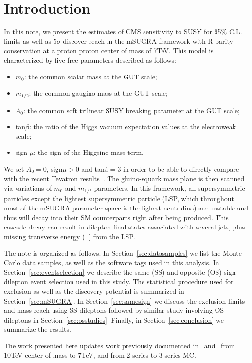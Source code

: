 \section{Introduction}
\label{sec:intro}

In this note, we present the estimates of CMS sensitivity to SUSY for
95\% C.L. limits as well as $5\sigma$ discover reach 
in the mSUGRA framework with R-parity conservation at a proton proton
center of mass of 7TeV. This model is characterized by five 
free parameters described as follows: 

\begin{itemize}
\item $m_{0}$: the common scalar mass at the GUT scale; 
\item $m_{1/2}$: the common gaugino mass at the GUT scale; 
\item $A_{0}$: the common soft trilinear SUSY breaking parameter at
  the GUT scale; 
\item tan$\beta$: the ratio of the Higgs vacuum expectation values at
  the electroweak scale; 
\item sign $\mu$: the sign of the Higgsino mass term. 
\end{itemize}

We set $A_{0} = 0$, sign$\mu > 0$ and tan$\beta = 3$ in order to be
able to directly compare with the recent Tevatron
results~\cite{cdf:recentSusy,d0:recentSusy}. The gluino-squark
mass plane is then scanned  via variations of $m_{0}$ and $m_{1/2}$
parameters. In this framework, all supersymmetric particles except the
lightest supersymmetric particle (LSP, which throughout most of the
mSUGRA parameter space is the lighest neutralino) are unstable and
thus will decay into their SM counterparts right after being
produced. This cascade decay can result in dilepton final states
associated  with several jets, plus missing transverse energy (\met~)
from the LSP.  

The note is organized as follows. In Section~\ref{sec:datasamples} we
list the Monte Carlo data samples, as well as the  software tags used
in this analysis. In Section~\ref{sec:eventselection} we describe the
same (SS) and opposite (OS) sign  dilepton event selection used in
this study. The statistical procedure used for exclusion as well as
the discovery potential is summarized in Section~\ref{sec:mSUGRA}. In
Section~\ref{sec:samesign} we discuss the exclusion limits and mass
reach using SS dileptons followed by similar study involving OS
dileptons in Section~\ref{sec:osstudies}. Finally, in
Section~\ref{sec:conclusion} we summarize the results.  

The work presented here updates work previously documented
in~\cite{osnote} and~\cite{ssnote} from 10TeV center of mass to 7TeV, 
and from 2 series to 3 series MC.
 
 



